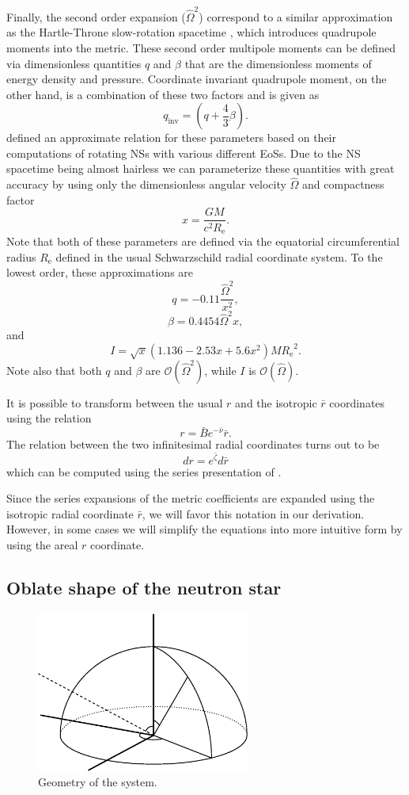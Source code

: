 \documentclass[iop, usenatbib]{emulateapj}
\newcommand{\be}{\begin{equation}}
\newcommand{\ee}{\end{equation}}
\newcommand{\Req}{\ensuremath{R_{\mathrm{e}}}}
\newcommand{\sch}{Schwarzschild }
\newcommand{\rb}{\ensuremath{\bar{r}}}
\newcommand{\Ob}{\ensuremath{\hat{\Omega}}}
\newcommand{\nub}{\ensuremath{\bar{\nu}}}
\newcommand{\zetab}{\ensuremath{\bar{\zeta}}}
\newcommand{\Bb}{\ensuremath{\bar{B}}}
\newcommand{\qinv}{\ensuremath{q_{\mathrm{inv}}}}
\begin{document}
Finally, the second order expansion ($\Ob^2$) correspond to a similar approximation as the Hartle-Throne slow-rotation spacetime \citep{HT68}, which introduces quadrupole moments into the metric.  
These second order multipole moments can be defined via dimensionless quantities $q$ and $\beta$ that are the dimensionless moments of energy density and pressure.  
Coordinate invariant quadrupole moment, on the other hand, is a combination of these two factors and is given as \citep{PA12}
\be
\qinv = \left( q + \frac{4}{3} \beta \right).
\ee
\citet{aGM14} defined an approximate relation for these parameters based on their computations of rotating NSs with various different EoSs.  
Due to the NS spacetime being almost hairless we can parameterize these quantities with great accuracy by using only the dimensionless angular velocity $\Ob$ and compactness factor
\be
x = \frac{G M}{c^2 \Req}.
\ee
Note that both of these parameters are defined via the equatorial circumferential radius $\Req$ defined in the usual \sch radial coordinate system.
To the lowest order, these approximations are
\be\label{eq:quad}
q = -0.11 \frac{\Ob^2}{x^2},
\ee
\be\label{eq:beta}
\beta = 0.4454 \Ob^2 x,
\ee
and
\be
I = \sqrt{x} (1.136 - 2.53 x + 5.6 x^2) M \Req^2.
\ee
Note also that both $q$ and $\beta$ are $\mathcal{O}(\Ob^2)$, while $I$ is $\mathcal{O}(\Ob)$.
    
It is possible to transform between the usual $r$ and the isotropic $\rb$ coordinates using the relation \citep{FIP86}
\be\label{eq:rb2r}
r = \Bb e^{-\nub} \rb.
\ee
The relation between the two infinitesimal radial coordinates turns out to be
\be\label{eq:drb2dr}
dr = e^{\zetab} d\rb
\ee
which can be computed using the series presentation of \cite{BI76}.

Since the series expansions of the metric coefficients are expanded using the isotropic radial coordinate $\rb$, we will favor this notation in our derivation.  
However, in some cases we will simplify the equations into more intuitive form by using the areal $r$ coordinate.


\subsection{Oblate shape of the neutron star}\label{sect:oblate}

\begin{figure}
\centering
\includegraphics[width=7cm]{figs/fig1.eps}
\caption{\label{fig:geom}
  Geometry of the system.
}
\end{figure}
\end{document}
